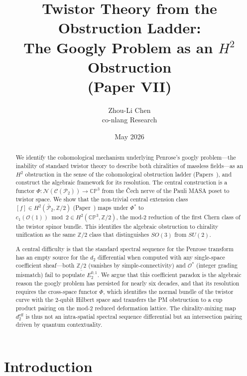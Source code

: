 \documentclass[11pt,a4paper]{article}
\title{Twistor Theory from the Obstruction Ladder:\\
The Googly Problem as an $H^2$ Obstruction\\
{\large (Paper VII)}}
\author{Zhou-Li Chen \\ co-nlang Research}
\date{May 2026}
\theoremstyle{remark}
\newcommand{\CP}{\mathbb{CP}}
\newcommand{\Z}{\mathbb{Z}}
\newcommand{\cO}{\mathcal{O}}
\begin{document}
\maketitle

\begin{abstract}
  We identify the cohomological mechanism underlying Penrose's
  googly problem---the inability of standard twistor theory to
  describe both chiralities of massless fields---as an $H^2$
  obstruction in the sense of the cohomological obstruction ladder
  (Papers~\cite{PaperI,PaperIII,PaperIV,PaperVI}), and construct the
  algebraic framework for its resolution. The central construction is a functor
  $\Phi: \mathcal{N}(\mathcal{C}(\mathcal{P}_2)) \to \CP^3$
  from the \v{C}ech nerve of the Pauli MASA poset to twistor space.
  We show that the non-trivial central extension class
  $[f] \in H^2(\bar{\mathcal{P}}_2, \Z/2)$ (Paper~\cite{PaperIII}) maps under $\Phi^*$
  to $c_1(\mathcal{O}(1)) \bmod 2 \in H^2(\CP^3, \Z/2)$, the mod-2 reduction
  of the first Chern class of the twistor spinor bundle.
  This identifies the algebraic obstruction to chirality unification
  as the same $\Z/2$ class that distinguishes $SO(3)$ from $SU(2)$.

  A central difficulty is that the standard spectral sequence for the
  Penrose transform has an empty source for the $d_2$ differential
  when computed with any single-space coefficient sheaf---both
  $\underline{\Z/2}$ (vanishes by simple-connectivity) and $\cO^*$
  (integer grading mismatch) fail to populate $E_2^{0,1}$.
  We argue that this coefficient paradox is the algebraic reason
  the googly problem has persisted for nearly six decades, and that its
  resolution requires the cross-space functor $\Phi$, which identifies
  the normal bundle of the twistor curve with the 2-qubit Hilbert space
  and transfers the PM obstruction to a cup product pairing on the
  mod-2 reduced deformation lattice.
  The chirality-mixing map $d_2^{\text{eff}}$ is thus not an
  intra-spatial spectral sequence differential but an intersection
  pairing driven by quantum contextuality.
\end{abstract}

\section{Introduction}
\label{sec:intro}
\end{document}
